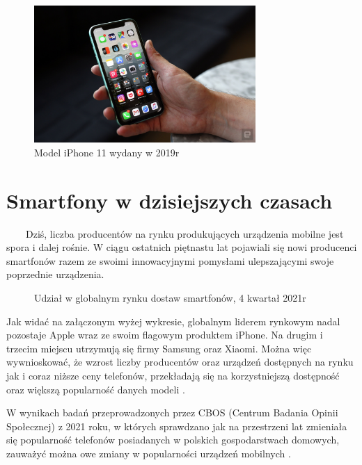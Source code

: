 \documentclass[a4paper,12pt,oneside]{book}
\begin{document}
	\begin{figure}[h]
		\centering
		\includegraphics[width=0.75\textwidth]{grafika/iphone11}
		\caption{Model iPhone 11 wydany w 2019r}
	\end{figure}
	
	\newpage
	\section{Smartfony w dzisiejszych czasach}
	\ \ \ \
	Dziś, liczba producentów na rynku produkujących urządzenia mobilne jest spora i dalej rośnie. W ciągu ostatnich piętnastu lat pojawiali się nowi producenci smartfonów razem ze swoimi innowacyjnymi pomysłami ulepszającymi swoje poprzednie urządzenia. 
	
	\begin{figure}[h]
		\centering
		\caption{Udział w globalnym rynku dostaw smartfonów, 4 kwartał 2021r}
	\end{figure}
	
	Jak widać na załączonym wyżej wykresie, globalnym liderem rynkowym nadal pozostaje Apple wraz ze swoim flagowym produktem iPhone. Na drugim i trzecim miejscu utrzymują się firmy Samsung oraz Xiaomi. Można więc wywnioskować, że wzrost liczby producentów oraz urządzeń dostępnych na rynku jak i coraz niższe ceny telefonów, przekładają się na korzystniejszą dostępność oraz większą popularność danych modeli \cite{ref3}. 
	
	W wynikach badań przeprowadzonych przez CBOS (Centrum Badania Opinii Społecznej) z 2021 roku, w których sprawdzano jak na przestrzeni lat zmieniała się popularność telefonów posiadanych w polskich gospodarstwach domowych, zauważyć można owe zmiany w popularności urządzeń mobilnych \cite{ref4} .
	
\end{document}
